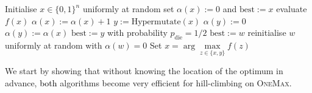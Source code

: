 \documentclass[lettersize,journal]{IEEEtran}
\newcommand{\new}[1]{\textcolor{black}{#1}}
\begin{document}
 	\begin{algorithm}[t] 
 		\caption{$(1+1)$~Opt-IA$_{\textsc{FirstBest}}$ }
 		\begin{algorithmic}[1] %
 			\STATE Initialise $x \in\{0,1\}^n$ uniformly at random %
 			\STATE set $\alpha(x):=0$ and $\text{best}:=x$      
 			\STATE evaluate $f(x)$    
 			\STATE $\alpha(x):=\alpha(x)+1$
 			\STATE $y:=\text{Hypermutate}(x)$
 			\STATE $\alpha(y):=0$
 			\ELSE
 			\STATE $\alpha(y):=\alpha(x)$
 			\ENDIF
 			\STATE $\text{best}:=y$
 			\ENDIF
 			\STATE with probability $p_{\text{die}}=1/2$
 			{\color{black} 
 			\STATE $\text{best}:=w$
 			\ENDIF}
 			\STATE reinitialise $w$ uniformly at random with $\alpha(w)=0$
 			\ENDIF
 			\ENDFOR
 			\STATE Set $x=\arg\max\limits_{z\in\{x,y\}}f(z)$
 			\ENDWHILE
 		\end{algorithmic} 
 		\label{alg:alg2+ageing}
 	\end{algorithm}









% 

We start by showing that without knowing the location of the optimum in advance, \new{both} algorithms become very efficient for hill-climbing on \textsc{OneMax}. %
\end{document}
